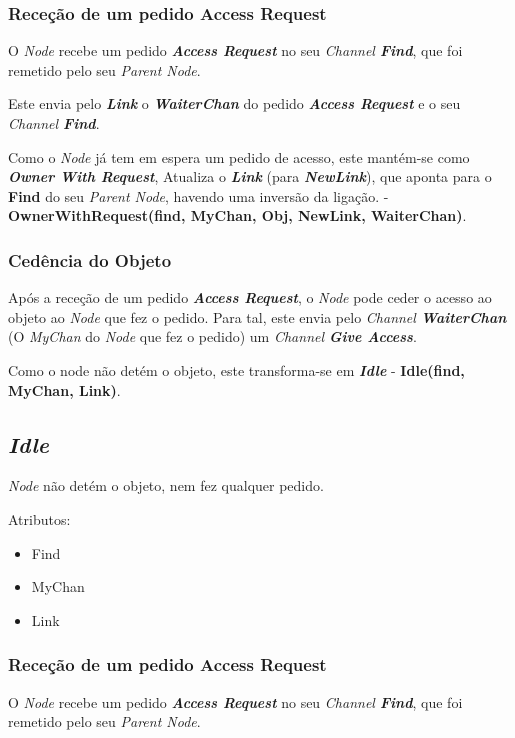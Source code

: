 \subsubsection*{Receção de um pedido Access Request}
O \emph{Node} recebe um pedido \emph{\textbf{Access Request}} no seu \emph{Channel \textbf{Find}},
que foi remetido pelo seu \emph{Parent Node}.

Este envia pelo \textbf{\emph{Link}} o \textbf{\emph{WaiterChan}} do pedido \emph{\textbf{Access Request}} e o seu \emph{Channel \textbf{Find}}.

Como o \emph{Node} já tem em espera um pedido de acesso, este mantém-se como \emph{\textbf{Owner With Request}},
Atualiza o \textbf{\emph{Link}} (para \textbf{\emph{NewLink}}),
que aponta para o \textbf{Find} do seu \emph{Parent Node}, havendo uma inversão da ligação.
- \textbf{OwnerWithRequest(find, MyChan, Obj, NewLink, WaiterChan)}.


\subsubsection*{Cedência do Objeto}
Após a receção de um pedido \emph{\textbf{Access Request}}, o \emph{Node} pode ceder o acesso ao objeto ao \emph{Node} que fez o pedido.
Para tal, este envia pelo \emph{Channel \textbf{WaiterChan}} (O \emph{MyChan} do \emph{Node} que fez o pedido) um \emph{Channel \textbf{Give Access}}.

Como o node não detém o objeto, este transforma-se em \emph{\textbf{Idle}} - \textbf{Idle(find, MyChan, Link)}.





\subsection{\emph{Idle}}
\label{especificacao:nodes:idle}

\emph{Node} não detém o objeto, nem fez qualquer pedido. 

Atributos:
\begin{itemize}
    \item Find
    \item MyChan
    \item Link
\end{itemize}

\subsubsection*{Receção de um pedido Access Request}
O \emph{Node} recebe um pedido \emph{\textbf{Access Request}} no seu \emph{Channel \textbf{Find}}, que foi remetido pelo seu \emph{Parent Node}.

